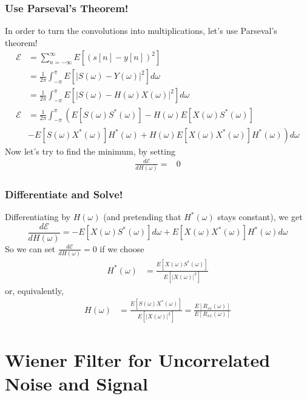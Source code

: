\documentclass{beamer}
\begin{document}
\begin{frame}
  \frametitle{Use Parseval's Theorem!}

  In order to turn the convolutions into multiplications, let's use
  Parseval's theorem!
  \begin{align*}
    {\mathcal E}&=\sum_{n=-\infty}^\infty E\left[\left(s[n]-y[n]\right)^2\right]\\
    &=\frac{1}{2\pi}\int_{-\pi}^\pi E\left[\left|S(\omega)-Y(\omega)\right|^2\right] d\omega\\
    &=\frac{1}{2\pi}\int_{-\pi}^\pi E\left[\left|S(\omega)-H(\omega)X(\omega)\right|^2\right] d\omega\\
    {\mathcal E} &=\frac{1}{2\pi}\int_{-\pi}^\pi \left(E\left[S(\omega)S^*(\omega)\right]
    -H(\omega)E\left[X(\omega)S^*(\omega)\right]\right.\\
    &-\left.E\left[S(\omega)X^*(\omega)\right]H^*(\omega)
    +H(\omega)E\left[X(\omega)X^*(\omega)\right]H^*(\omega)\right) d\omega
  \end{align*}
  Now let's try to find the minimum, by setting
  \begin{align*}
    \frac{d{\mathcal E}}{dH(\omega)}=&0
  \end{align*}
\end{frame}
  
\begin{frame}
  \frametitle{Differentiate and Solve!}
  
  Differentiating by $H(\omega)$ (and pretending that $H^*(\omega)$
  stays constant), we get
  \begin{displaymath}
    \frac{d{\mathcal E}}{dH(\omega)}
    =-E\left[X(\omega)S^*(\omega)\right]d\omega +
    E\left[X(\omega)X^*(\omega)\right]H^*(\omega)d\omega
  \end{displaymath}
  So we can set $\frac{d{\mathcal E}}{dH(\omega)}=0$ if we choose
  \begin{align*}
    H^*(\omega)&=\frac{E\left[X(\omega)S^*(\omega)\right]}{E\left[|X(\omega)|^2\right]}
  \end{align*}
  or, equivalently, 
  \begin{align*}
    H(\omega)&=\frac{E\left[S(\omega)X^*(\omega)\right]}{E\left[|X(\omega)|^2\right]}
    =\frac{E\left[R_{sx}(\omega)\right]}{E\left[R_{xx}(\omega)\right]}
  \end{align*}
\end{frame}

\section[Uncorrelated Noise and Signal]{Wiener Filter for Uncorrelated Noise and Signal}
\setcounter{subsection}{1}
\end{document}
